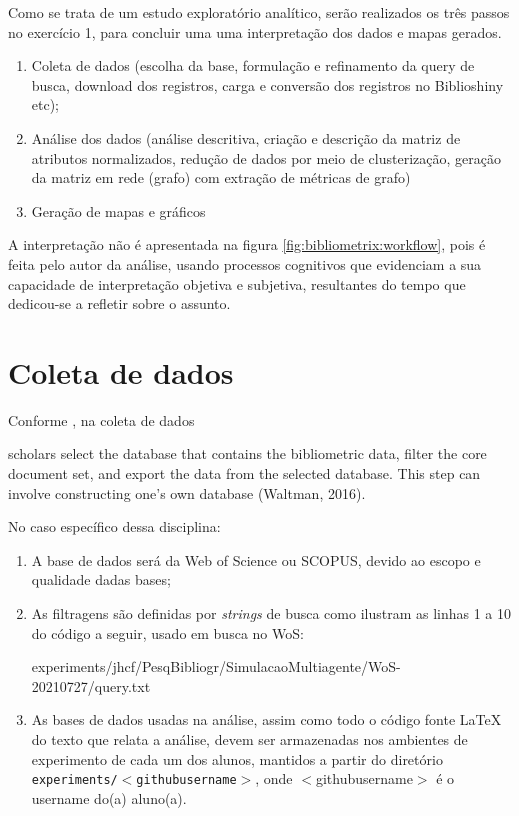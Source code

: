 Como se trata de um estudo exploratório analítico, serão realizados os três passos no exercício 1, para concluir uma uma interpretação dos dados e mapas gerados.
\begin{enumerate}
    \item Coleta de dados (escolha da base, formulação e refinamento da query de busca, download dos registros, carga e conversão dos registros no Biblioshiny etc);
    \item Análise dos dados (análise descritiva, criação e descrição da matriz de atributos normalizados, redução de dados por meio de clusterização, geração da matriz em rede (grafo) com extração de métricas de grafo)
    \item Geração de mapas e gráficos
\end{enumerate}

A interpretação não é apresentada na figura \ref{fig:bibliometrix:workflow}, pois é feita pelo autor da análise, usando processos cognitivos que evidenciam a sua capacidade de interpretação objetiva e subjetiva, resultantes do tempo que dedicou-se a refletir sobre o assunto.

\section{Coleta de dados}

Conforme \cite{aria_bibliometrix_2017},
na coleta de dados 

\begin{itquote}
    scholars select the database that contains the bibliometric data, filter the core document set, and export
the data from the selected database. This step can involve constructing one’s own database (Waltman, 2016).
\end{itquote}

No caso específico dessa disciplina:
\begin{enumerate}
    \item A base de dados será da Web of Science ou SCOPUS, devido ao escopo e qualidade dadas bases;
    \item As filtragens são definidas por \textit{strings} de busca como ilustram as linhas 1 a 10 do código a seguir, usado em busca no WoS:

{experiments/jhcf/PesqBibliogr/SimulacaoMultiagente/WoS-20210727/query.txt}

\item As bases de dados usadas na análise, assim como todo o código fonte \LaTeX~ do texto que relata a análise, devem ser armazenadas nos ambientes de experimento de cada um dos alunos, mantidos a partir do diretório \texttt{experiments/$<$githubusername$>$}, onde $<$githubusername$>$ é o username do(a) aluno(a).

\end{enumerate}

